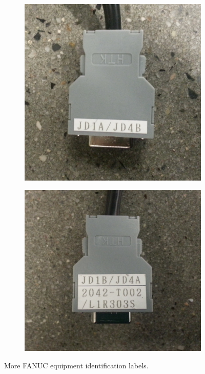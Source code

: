 \begin{figure}
\begin{subfigure}{.5\textwidth}
    \end{subfigure} \\
    \begin{subfigure}{.5\textwidth}
        \centering
        \includegraphics[width=.8\linewidth]{figures/stickers/io-link-a-connector}
    \end{subfigure}%
    \begin{subfigure}{.5\textwidth}
        \centering
        \includegraphics[width=.8\linewidth]{figures/stickers/io-link-b-connector}
    \end{subfigure}
    \caption{More FANUC equipment identification labels.}
    \label{fig:stickers}
\end{figure}

